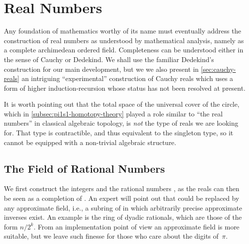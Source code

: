 \newcommand{\rclim}{\mathsf{lim}} %
\newcommand{\rcrat}{\mathsf{rat}} %
\newcommand{\rceq}{\mathsf{eq}_{\RC}} %
\newcommand{\CAP}{\mathcal{C}}    %
\newcommand{\Qp}{\Q_{+}}

\newcommand{\dcut}{\mathsf{isCut}}  %


\chapter{Real Numbers}
\label{cha:real-numbers}

Any foundation of mathematics worthy of its name must eventually address the construction
of real numbers as understood by mathematical analysis, namely as a complete archimedean
ordered field. Completeness can be understood either in the sense of Cauchy or Dedekind.
We shall use the familiar Dedekind's construction for our main development, but we we also
present in \autoref{sec:cauchy-reals} an intriguing ``experimental'' construction of
Cauchy reals which uses a form of higher induction-recursion whose status has not been
resolved at present.

It is worth pointing out that the total space of the universal cover of the circle, which
in \autoref{subsec:pi1s1-homotopy-theory} played a role similar to ``the real numbers'' in
classical algebraic topology, is \emph{not} the type of reals we are looking for. That
type is contractible, and thus equivalent to the singleton type, so it cannot be equipped
with a non-trivial algebraic structure.


\section{The Field of Rational Numbers}
\label{sec:field-rati-numb}

We first construct the integers \Z and the rational numbers \Q, as the reals can then be
seen as a completion of \Q. An expert will point out that \Q could be replaced by any
approximate field, i.e., a subring of \Q in which arbitrarily precise approximate inverses
exist. An example is the ring of dyadic rationals, which are those of the form $n/2^k$.
From an implementation point of view an approximate field is more suitable, but we leave
such finesse for those who care about the digits of~$\pi$.

